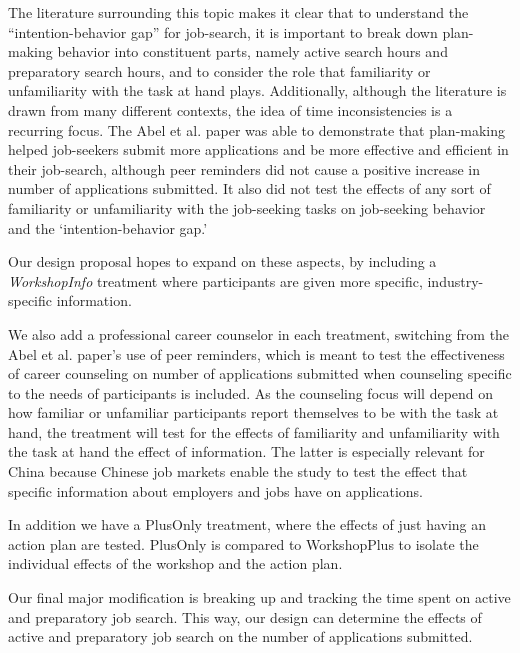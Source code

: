 \documentclass[]{elsarticle} %
\begin{document}
The literature surrounding this topic makes it clear that to understand
the ``intention-behavior gap'' for job-search, it is important to break
down plan-making behavior into constituent parts, namely active search
hours and preparatory search hours, and to consider the role that
familiarity or unfamiliarity with the task at hand plays. Additionally,
although the literature is drawn from many different contexts, the idea
of time inconsistencies is a recurring focus. The Abel et al. paper was
able to demonstrate that plan-making helped job-seekers submit more
applications and be more effective and efficient in their job-search,
although peer reminders did not cause a positive increase in number of
applications submitted. It also did not test the effects of any sort of
familiarity or unfamiliarity with the job-seeking tasks on job-seeking
behavior and the `intention-behavior gap.'

Our design proposal hopes to expand on these aspects, by including a
\emph{WorkshopInfo} treatment where participants are given more
specific, industry-specific information.

We also add a professional career counselor in each treatment, switching
from the Abel et al. paper's use of peer reminders, which is meant to
test the effectiveness of career counseling on number of applications
submitted when counseling specific to the needs of participants is
included. As the counseling focus will depend on how familiar or
unfamiliar participants report themselves to be with the task at hand,
the treatment will test for the effects of familiarity and unfamiliarity
with the task at hand the effect of information. The latter is
especially relevant for China because Chinese job markets enable the
study to test the effect that specific information about employers and
jobs have on applications.

In addition we have a PlusOnly treatment, where the effects of just
having an action plan are tested. PlusOnly is compared to WorkshopPlus
to isolate the individual effects of the workshop and the action plan.

Our final major modification is breaking up and tracking the time spent
on active and preparatory job search. This way, our design can determine
the effects of active and preparatory job search on the number of
applications submitted.
\end{document}
